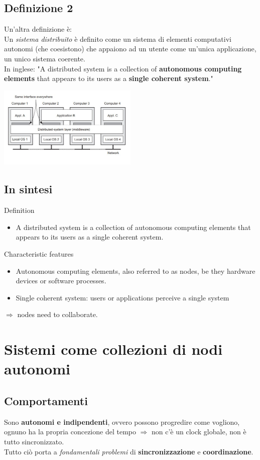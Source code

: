 \subsection{Definizione 2}
Un'altra definizione è:
\\Un \textit{sistema distribuito} è definito come un sistema di elementi computativi autonomi (che coesistono) che appaiono ad un utente come un'unica applicazione, un unico sistema coerente.
\\In inglese: "A distributed system is a collection of \textbf{autonomous computing elements} that appears to its users as a \textbf{single coherent system}."
\begin{center}
    \includegraphics[width=0.5\textwidth]{img/lez28022023_def2.jpg}
\end{center}

\subsection{In sintesi}
Definition
\begin{itemize}
    \item A distributed system is a collection of autonomous computing elements that appears to its users as a single coherent system.
\end{itemize}
Characteristic features
\begin{itemize}
   \item Autonomous computing elements, also referred to as nodes, be they hardware devices or software processes.
   \item Single coherent system: users or applications perceive a single system
\end{itemize}
$\Rightarrow$ nodes need to collaborate.

\section{Sistemi come collezioni di nodi autonomi}
\subsection{Comportamenti}
Sono \textbf{autonomi e indipendenti}, ovvero possono progredire come vogliono, ognuno ha la propria concezione del tempo $\Rightarrow$ non c'è un clock globale, non è tutto sincronizzato.
\\Tutto ciò porta a \textit{fondamentali problemi} di \textbf{sincronizzazione} e \textbf{coordinazione}.

